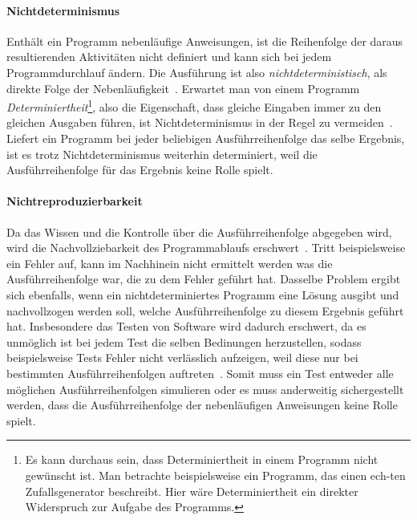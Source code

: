 \paragraph{Nichtdeterminismus}
Enthält ein Programm nebenläufige Anweisungen, ist die Reihenfolge der daraus resultierenden Aktivitäten nicht definiert und kann sich bei jedem Programmdurchlauf ändern. Die Ausführung ist also \emph{nichtdeterministisch}, als direkte Folge der Nebenläufigkeit~\cite{Herrtwich1989}. Erwartet man von einem Programm \emph{Determiniertheit}\footnote{Es kann durchaus sein, dass Determiniertheit in einem Programm nicht gewünscht ist. Man betrachte beispielsweise ein Programm, das einen ech-ten Zufallsgenerator beschreibt. Hier wäre Determiniertheit ein direkter Widerspruch zur Aufgabe des Programms.}, also die Eigenschaft, dass gleiche Eingaben immer zu den gleichen Ausgaben führen, ist Nichtdeterminismus in der Regel zu vermeiden~\cite{Herrtwich1989}. Liefert ein Programm bei jeder beliebigen Ausführreihenfolge das selbe Ergebnis, ist es trotz Nichtdeterminismus weiterhin determiniert, weil die Ausführreihenfolge für das Ergebnis keine Rolle spielt. 
\paragraph{Nichtreproduzierbarkeit}
Da das Wissen und die Kontrolle über die Ausführreihenfolge abgegeben wird, wird die Nachvollziebarkeit des Programmablaufs erschwert~\cite{Herrtwich1989}. Tritt beispielsweise ein Fehler auf, kann im Nachhinein nicht ermittelt werden was die Ausführreihenfolge war, die zu dem Fehler geführt hat. Dasselbe Problem ergibt sich ebenfalls, wenn ein nichtdeterminiertes Programm eine Lösung ausgibt und nachvollzogen werden soll, welche Ausführreihenfolge zu diesem Ergebnis geführt hat. Insbesondere das Testen von Software wird dadurch erschwert, da es unmöglich ist bei jedem Test die selben Bedinungen herzustellen, sodass beispielsweise Tests Fehler nicht verlässlich aufzeigen, weil diese nur bei bestimmten Ausführreihenfolgen auftreten~\cite{Herrtwich1989}. Somit muss ein Test entweder alle möglichen Ausführreihenfolgen simulieren oder es muss anderweitig sichergestellt werden, dass die Ausführreihenfolge der nebenläufigen Anweisungen keine Rolle spielt.
